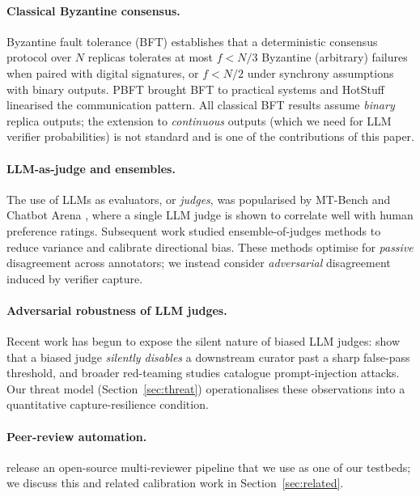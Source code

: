 \documentclass[11pt]{article}
\begin{document}
\paragraph{Classical Byzantine consensus.}
Byzantine fault tolerance (BFT) \citep{lamport1982byzantine} establishes
that a deterministic consensus protocol over $N$ replicas tolerates at
most $f < N/3$ Byzantine (arbitrary) failures when paired with digital
signatures, or $f < N/2$ under synchrony assumptions with binary outputs.
PBFT \citep{castro1999pbft} brought BFT to practical systems and
HotStuff \citep{yin2019hotstuff} linearised the communication pattern.
All classical BFT results assume \emph{binary} replica outputs; the
extension to \emph{continuous} outputs (which we need for LLM verifier
probabilities) is not standard and is one of the contributions of this
paper.

\paragraph{LLM-as-judge and ensembles.}
The use of LLMs as evaluators, or \emph{judges}, was popularised by
MT-Bench and Chatbot Arena \citep{zheng2023judging}, where a single
LLM judge is shown to correlate well with human preference ratings.
Subsequent work studied ensemble-of-judges methods
\citep{cui2026edo,leung2026rubricllm} to reduce variance and calibrate
directional bias. These methods optimise for \emph{passive} disagreement
across annotators; we instead consider \emph{adversarial} disagreement
induced by verifier capture.

\paragraph{Adversarial robustness of LLM judges.}
Recent work has begun to expose the silent nature of biased LLM
judges: \citet{zhang2026blindcurator} show that a biased judge
\emph{silently disables} a downstream curator past a sharp false-pass
threshold, and broader red-teaming studies
\citep{perez2022red,schulhoff2023ignore} catalogue prompt-injection
attacks. Our threat model (Section~\ref{sec:threat}) operationalises
these observations into a quantitative capture-resilience condition.

\paragraph{Peer-review automation.}
\citet{liu2026paperreviewtoolkit} release an open-source multi-reviewer
pipeline that we use as one of our testbeds; we discuss this and
related calibration work \citep{liu2026calibration} in
Section~\ref{sec:related}.
\end{document}
